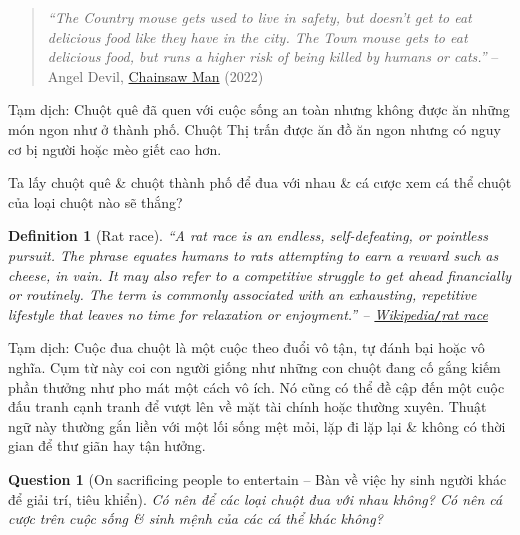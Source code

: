 \documentclass[12pt,oneside]{book}
\newtheorem{definition}{Definition}[section]
\newtheorem{question}{Question}
\begin{document}
\begin{quotation}
	{\it``The Country mouse gets used to live in safety, but doesn't get to eat delicious food like they have in the city. The Town mouse gets to eat delicious food, but runs a higher risk of being killed by humans or cats.''} -- {\sc Angel Devil}, \href{https://www.imdb.com/title/tt13616990/}{Chainsaw Man} (2022)
\end{quotation}
{\sf Tạm dịch}: Chuột quê đã quen với cuộc sống an toàn nhưng không được ăn những món ngon như ở thành phố. Chuột Thị trấn được ăn đồ ăn ngon nhưng có nguy cơ bị người hoặc mèo giết cao hơn.

Ta lấy chuột quê \& chuột thành phố để đua với nhau \& cá cược xem cá thể chuột của loại chuột nào sẽ thắng?

\begin{definition}[Rat race]
	``A \emph{rat race} is an endless, self-defeating, or pointless pursuit. The phrase equates humans to rats attempting to earn a reward such as cheese, in vain. It may also refer to a competitive struggle to get ahead financially or routinely. The term is commonly associated with an exhausting, repetitive lifestyle that leaves no time for relaxation or enjoyment.'' -- \href{https://en.wikipedia.org/wiki/Rat_race}{Wikipedia{\tt/}rat race}
\end{definition}
{\sf Tạm dịch}: Cuộc đua chuột là một cuộc theo đuổi vô tận, tự đánh bại hoặc vô nghĩa. Cụm từ này coi con người giống như những con chuột đang cố gắng kiếm phần thưởng như pho mát một cách vô ích. Nó cũng có thể đề cập đến một cuộc đấu tranh cạnh tranh để vượt lên về mặt tài chính hoặc thường xuyên. Thuật ngữ này thường gắn liền với một lối sống mệt mỏi, lặp đi lặp lại \& không có thời gian để thư giãn hay tận hưởng.

\begin{question}[On sacrificing people to entertain -- Bàn về việc hy sinh người khác để giải trí, tiêu khiển]
	Có nên để các loại chuột đua với nhau không? Có nên cá cược trên cuộc sống \& sinh mệnh của các cá thể khác không?
\end{question}
\end{document}
